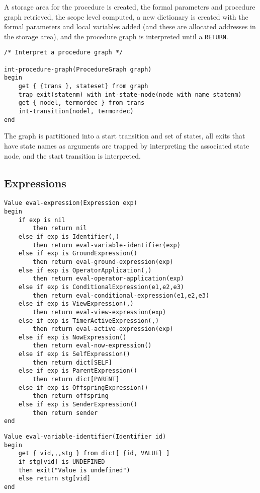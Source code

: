 A storage area for the procedure is created, the formal parameters
and procedure graph retrieved, the scope level computed, a new
dictionary is created with the formal parameters and local variables
added (and these are allocated addresses in the storage area), and
the procedure graph is interpreted until a {\tt RETURN}.

\begin{verbatim}
/* Interpret a procedure graph */

int-procedure-graph(ProcedureGraph graph)
begin
    get { {trans }, stateset} from graph
    trap exit(statenm) with int-state-node(node with name statenm)
    get { nodel, termordec } from trans
    int-transition(nodel, termordec)
end
\end{verbatim}

The graph is partitioned into a start transition and set of states,
all exits that have state names as arguments are trapped by
interpreting the associated state node, and the start transition is
interpreted.

\subsection{Expressions}

\begin{verbatim}
Value eval-expression(Expression exp)
begin
    if exp is nil 
        then return nil
    else if exp is Identifier(,)
        then return eval-variable-identifier(exp)
    else if exp is GroundExpression()
        then return eval-ground-expression(exp)
    else if exp is OperatorApplication(,)
        then return eval-operator-application(exp)
    else if exp is ConditionalExpression(e1,e2,e3)
        then return eval-conditional-expression(e1,e2,e3)
    else if exp is ViewExpression(,)
        then return eval-view-expression(exp)
    else if exp is TimerActiveExpression(,)
        then return eval-active-expression(exp)
    else if exp is NowExpression()
        then return eval-now-expression()
    else if exp is SelfExpression()
        then return dict[SELF]
    else if exp is ParentExpression()
        then return dict[PARENT]
    else if exp is OffspringExpression()
        then return offspring
    else if exp is SenderExpression()
        then return sender
end
\end{verbatim}

\begin{verbatim}
Value eval-variable-identifier(Identifier id)
begin
    get { vid,,,stg } from dict[ {id, VALUE} ]
    if stg[vid] is UNDEFINED
    then exit("Value is undefined")
    else return stg[vid]
end
\end{verbatim}

